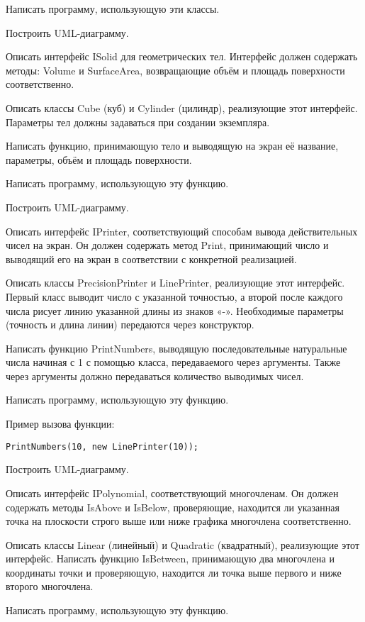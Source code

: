 Написать программу, использующую эти классы.

Построить UML-диаграмму.

\task Описать интерфейс ISolid для геометрических тел. Интерфейс
должен содержать методы: Volume и SurfaceArea, возвращающие объём и
площадь поверхности соответственно.

Описать классы Cube (куб) и Cylinder (цилиндр), реализующие этот
интерфейс. Параметры тел должны задаваться при создании экземпляра.

Написать функцию, принимающую тело и выводящую на экран её название,
параметры, объём и площадь поверхности.

Написать программу, использующую эту функцию.

Построить UML-диаграмму.

\task Описать интерфейс IPrinter, соответствующий способам вывода
действительных чисел на экран. Он должен содержать метод Print,
принимающий число и выводящий его на экран в соответствии с конкретной
реализацией.

Описать классы PrecisionPrinter и LinePrinter, реализующие этот
интерфейс. Первый класс выводит число с указанной точностью, а второй
после каждого числа рисует линию указанной длины из знаков
«-». Необходимые параметры (точность и длина линии) передаются через
конструктор.

Написать функцию PrintNumbers, выводящую последовательные натуральные
числа начиная с 1 с помощью класса, передаваемого через
аргументы. Также через аргументы должно передаваться количество
выводимых чисел.

Написать программу, использующую эту функцию.

Пример вызова функции:
\begin{lstlisting}[numbers=none]
PrintNumbers(10, new LinePrinter(10));
\end{lstlisting}

Построить UML-диаграмму.

\task Описать интерфейс IPolynomial, соответствующий многочленам. Он
должен содержать методы IsAbove и IsBelow, проверяющие, находится ли
указанная точка на плоскости строго выше или ниже графика многочлена
соответственно.

Описать классы Linear (линейный) и Quadratic (квадратный), реализующие
этот интерфейс. Написать функцию IsBetween, принимающую два многочлена
и координаты точки и проверяющую, находится ли точка выше первого и
ниже второго многочлена.

Написать программу, использующую эту функцию.

